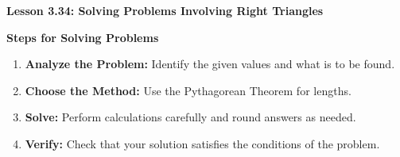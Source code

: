 \begin{center}
\textbf{Lesson 3.34: Solving Problems Involving Right Triangles}
\end{center}

\vspace*{-1.5ex}

\noindent\textbf{Steps for Solving Problems}

\begin{enumerate}[noitemsep, label = \color{blue}\arabic*. ]
    \item \textbf{Analyze the Problem:} Identify the given values and what is to be found.
    \item \textbf{Choose the Method:} Use the Pythagorean Theorem for lengths.
    \item \textbf{Solve:} Perform calculations carefully and round answers as needed.
    \item \textbf{Verify:} Check that your solution satisfies the conditions of the problem.
\end{enumerate}
